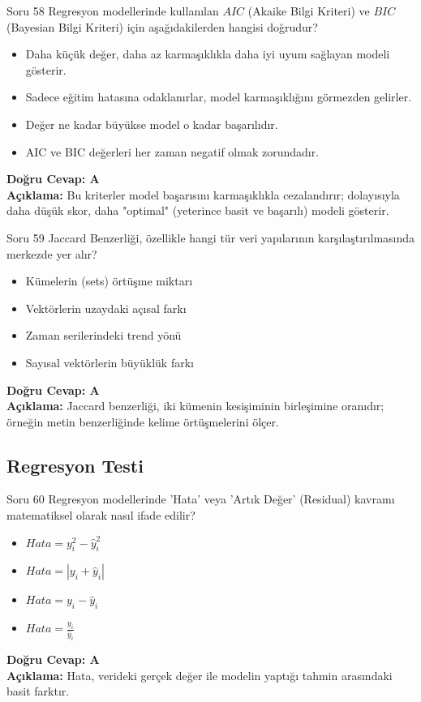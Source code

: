 \documentclass[12pt,a4paper]{article}
\begin{document}
\begin{testcard}{Soru 58}
    Regresyon modellerinde kullanılan $AIC$ (Akaike Bilgi Kriteri) ve $BIC$ (Bayesian Bilgi Kriteri) için aşağıdakilerden hangisi doğrudur?
    \begin{itemize}
        \item[A)] Daha küçük değer, daha az karmaşıklıkla daha iyi uyum sağlayan modeli gösterir.
        \item[B)] Sadece eğitim hatasına odaklanırlar, model karmaşıklığını görmezden gelirler.
        \item[C)] Değer ne kadar büyükse model o kadar başarılıdır.
        \item[D)] AIC ve BIC değerleri her zaman negatif olmak zorundadır.
    \end{itemize}
    \tcblower
    \textbf{Doğru Cevap: A} \\
    \textbf{Açıklama:} Bu kriterler model başarısını karmaşıklıkla cezalandırır; dolayısıyla daha düşük skor, daha "optimal" (yeterince basit ve başarılı) modeli gösterir.
\end{testcard}

\begin{testcard}{Soru 59}
    Jaccard Benzerliği, özellikle hangi tür veri yapılarının karşılaştırılmasında merkezde yer alır?
    \begin{itemize}
        \item[A)] Kümelerin (sets) örtüşme miktarı
        \item[B)] Vektörlerin uzaydaki açısal farkı
        \item[C)] Zaman serilerindeki trend yönü
        \item[D)] Sayısal vektörlerin büyüklük farkı
    \end{itemize}
    \tcblower
    \textbf{Doğru Cevap: A} \\
    \textbf{Açıklama:} Jaccard benzerliği, iki kümenin kesişiminin birleşimine oranıdır; örneğin metin benzerliğinde kelime örtüşmelerini ölçer.
\end{testcard}

\newpage
\subsection{Regresyon Testi}

\begin{testcard}{Soru 60}
    Regresyon modellerinde 'Hata' veya 'Artık Değer' (Residual) kavramı matematiksel olarak nasıl ifade edilir?
    \begin{itemize}
        \item[A)] $Hata = y_i^2 - \hat{y}_i^2$
        \item[B)] $Hata = |y_i + \hat{y}_i|$
        \item[C)] $Hata = y_i - \hat{y}_i$
        \item[D)] $Hata = \frac{y_i}{\hat{y}_i}$
    \end{itemize}
    \tcblower
    \textbf{Doğru Cevap: A} \\
    \textbf{Açıklama:} Hata, verideki gerçek değer ile modelin yaptığı tahmin arasındaki basit farktır.
\end{testcard}
\end{document}
